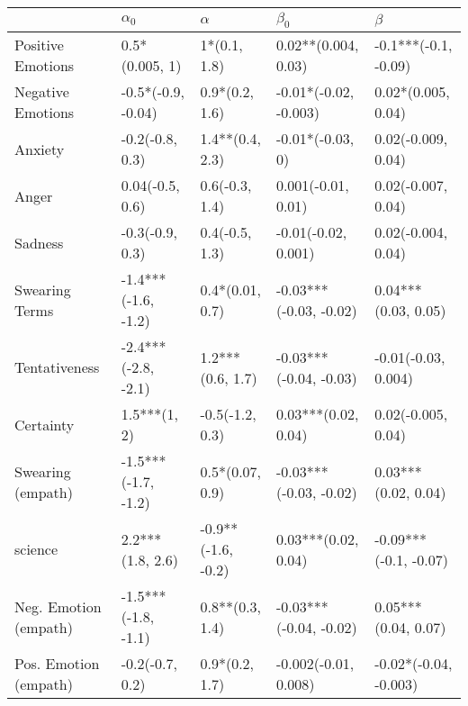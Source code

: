 \begin{tabular}{lllll}
\toprule
{} &           $\alpha_0$ &            $\alpha$ &               $\beta_0$ &                $\beta$ \\
\midrule
Positive Emotions     &       0.5*(0.005, 1) &        1*(0.1, 1.8) &     0.02**(0.004, 0.03) &   -0.1***(-0.1, -0.09) \\
Negative Emotions     &   -0.5*(-0.9, -0.04) &      0.9*(0.2, 1.6) &   -0.01*(-0.02, -0.003) &     0.02*(0.005, 0.04) \\
Anxiety               &      -0.2(-0.8, 0.3) &     1.4**(0.4, 2.3) &        -0.01*(-0.03, 0) &     0.02(-0.009, 0.04) \\
Anger                 &      0.04(-0.5, 0.6) &      0.6(-0.3, 1.4) &      0.001(-0.01, 0.01) &     0.02(-0.007, 0.04) \\
Sadness               &      -0.3(-0.9, 0.3) &      0.4(-0.5, 1.3) &     -0.01(-0.02, 0.001) &     0.02(-0.004, 0.04) \\
Swearing Terms        &  -1.4***(-1.6, -1.2) &     0.4*(0.01, 0.7) &  -0.03***(-0.03, -0.02) &    0.04***(0.03, 0.05) \\
Tentativeness         &  -2.4***(-2.8, -2.1) &    1.2***(0.6, 1.7) &  -0.03***(-0.04, -0.03) &    -0.01(-0.03, 0.004) \\
Certainty             &         1.5***(1, 2) &     -0.5(-1.2, 0.3) &     0.03***(0.02, 0.04) &     0.02(-0.005, 0.04) \\
Swearing (empath)     &  -1.5***(-1.7, -1.2) &     0.5*(0.07, 0.9) &  -0.03***(-0.03, -0.02) &    0.03***(0.02, 0.04) \\
science               &     2.2***(1.8, 2.6) &  -0.9**(-1.6, -0.2) &     0.03***(0.02, 0.04) &  -0.09***(-0.1, -0.07) \\
Neg. Emotion (empath) &  -1.5***(-1.8, -1.1) &     0.8**(0.3, 1.4) &  -0.03***(-0.04, -0.02) &    0.05***(0.04, 0.07) \\
Pos. Emotion (empath) &      -0.2(-0.7, 0.2) &      0.9*(0.2, 1.7) &    -0.002(-0.01, 0.008) &  -0.02*(-0.04, -0.003) \\
\bottomrule
\end{tabular}
